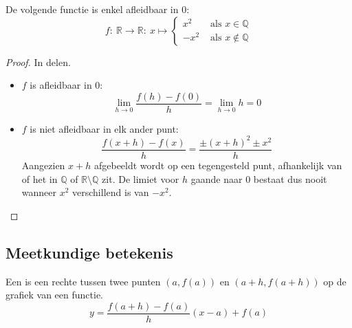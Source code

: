 \documentclass[main.tex]{subfiles}
\begin{document}
\begin{vb}
  De volgende functie is enkel afleidbaar in $0$:
  \[
  f:\ \mathbb{R}\rightarrow \mathbb{R}:\ x \mapsto
  \left\{
    \begin{array}{rl}
      x^{2} & \text{ als } x\in \mathbb{Q}\\
      -x^{2} & \text{ als } x \not \in \mathbb{Q}
    \end{array}
  \right.
  \]

  \begin{proof}
    In delen.
    \begin{itemize}
    \item $f$ is afleidbaar in $0$:\\
      \[ \lim_{h \rightarrow 0}\frac{f(h) - f(0)}{h} = \lim_{h \rightarrow 0}h = 0 \]
    \item $f$ is niet afleidbaar in elk ander punt:\\
        \[
        \frac{f(x+h)-f(x)}{h}
        = \frac{\pm(x+h)^{2}\pm x^{2}}{h}
        \]
        Aangezien $x+h$ afgebeeldt wordt op een tegengesteld punt, afhankelijk van of het in $\mathbb{Q}$ of $\mathbb{R} \setminus \mathbb{Q}$ zit. 
        De limiet voor $h$ gaande naar $0$ bestaat dus nooit wanneer $x^{2}$ verschillend is van $-x^{2}$.
    \end{itemize}
  \end{proof}
\end{vb}


\subsection{Meetkundige betekenis}
\label{sec:meetk-betek}

\begin{de}
  Een  is een rechte tussen twee punten $(a,f(a))$ en $(a+h,f(a+h))$ op de grafiek van een functie.
  \[ y = \frac{f(a+h) -f(a)}{h} (x-a) + f(a) \]
\end{de}
\end{document}
